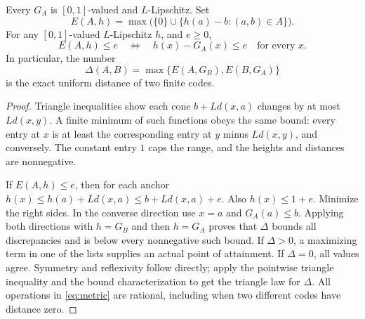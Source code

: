 \begin{lemma}\label{lem:anchors}
Every $G_A$ is $[0,1]$-valued and $L$-Lipschitz. Set
\[
 E(A,h)=\max\bigl(\{0\}\cup\{h(a)-b:(a,b)\in A\}\bigr).
\]
For any $[0,1]$-valued $L$-Lipschitz $h$, and $e\ge0$,
\[
  E(A,h)\le e\quad\Longleftrightarrow\quad
      h(x)-G_A(x)\le e\quad\text{for every }x.
\]
In particular, the number
\begin{equation}
 \Delta(A,B)=\max\{E(A,G_B),E(B,G_A)\}                 \label{eq:metric}
\end{equation}
is the exact uniform distance of two finite codes.
\end{lemma}
\begin{proof}
Triangle inequalities show each cone $b+Ld(x,a)$ changes by at most $Ld(x,y)$. A finite minimum of such functions obeys the same bound: every entry at $x$ is at least the corresponding entry at $y$ minus $Ld(x,y)$, and conversely. The constant entry $1$ caps the range, and the heights and distances are nonnegative.

If $E(A,h)\le e$, then for each anchor $h(x)\le h(a)+Ld(x,a)\le b+Ld(x,a)+e$. Also $h(x)\le 1+e$. Minimize the right sides. In the converse direction use $x=a$ and $G_A(a)\le b$. Applying both directions with $h=G_B$ and then $h=G_A$ proves that $\Delta$ bounds all discrepancies and is below every nonnegative such bound. If $\Delta>0$, a maximizing term in one of the lists supplies an actual point of attainment. If $\Delta=0$, all values agree. Symmetry and reflexivity follow directly; apply the pointwise triangle inequality and the bound characterization to get the triangle law for $\Delta$. All operations in \eqref{eq:metric} are rational, including when two different codes have distance zero.
\end{proof}

